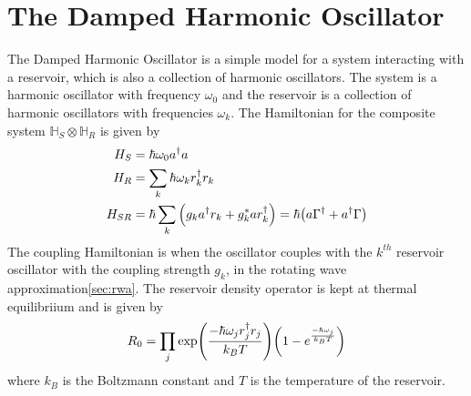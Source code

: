 \documentclass{scrartcl}
\newcommand{\1}{\mathbbm{1}}
\newcommand{\G}{\Gamma}
\newcommand{\h}{\mathbb{H}}
\begin{document}
\section{The Damped Harmonic Oscillator}
The Damped Harmonic Oscillator is a simple model for a system interacting with a reservoir, which is also a collection of 
harmonic oscillators. The system is a harmonic oscillator with frequency $\omega_0$ and the reservoir is a collection of harmonic oscillators with frequencies $\omega_k$.
The Hamiltonian for the composite system $\h_S \otimes \h_R$ is given by
\begin{align}
    H_S &= \hbar \omega_0 a^\dagger a \\
    H_R &= \sum_k \hbar \omega_k r_k^\dagger r_k \\
    H_{SR} &= \hbar \sum_k \qty(g_k a^\dagger r_k + g_k^* a r_k^\dagger) = \hbar \qty(a \G^\dagger + a^\dagger \G)
\end{align}
The coupling Hamiltonian is when the oscillator couples with the $k^{th}$ reservoir oscillator with the 
coupling strength $g_k$, in the rotating wave approximation\cref{sec:rwa}. The reservoir density operator
is kept at thermal equilibriium and is given by
\begin{align}
    R_0  = \prod_j \exp(\frac{- \hbar \omega_j r_j^\dagger r_j}{k_B T}) \qty(1 - e^{\frac{- \hbar \omega_j}{k_B T}})
\end{align}
where $k_B$ is the Boltzmann constant and $T$ is the temperature of the reservoir. 
\end{document}
